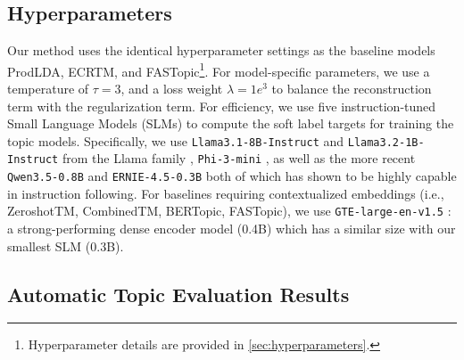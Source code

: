 \documentclass{article}
\theoremstyle{plain}
\theoremstyle{definition}
\theoremstyle{remark}
\begin{document}
\subsection{Hyperparameters} 
Our method uses the identical hyperparameter settings as the baseline models ProdLDA, ECRTM, and FASTopic\footnote{Hyperparameter details are provided in \autoref{sec:hyperparameters}.}.
For model-specific parameters, we use a temperature of $\tau = 3$, and a loss weight $\lambda = 1e^3$ to balance the reconstruction term with the regularization term. 
For efficiency, we use five instruction-tuned Small Language Models (SLMs) to compute the soft label targets for training the topic models.
Specifically, we use \texttt{Llama3.1-8B-Instruct} and \texttt{Llama3.2-1B-Instruct} from the Llama family \citep{grattafiori2024llama}, \texttt{Phi-3-mini} \citep{abdin2024phi}, as well as the more recent \texttt{Qwen3.5-0.8B} \citep{qwen2026qwen35} and \texttt{ERNIE-4.5-0.3B} \citep{ernie2025technicalreport} both of which has shown to be highly capable in instruction following. For baselines requiring contextualized embeddings (i.e., ZeroshotTM, CombinedTM, BERTopic, FASTopic), we use \texttt{GTE-large-en-v1.5} \citep{zhang-etal-2024-mgte}: a strong-performing dense encoder model (0.4B) which has a similar size with our smallest SLM (0.3B).

\subsection{Automatic Topic Evaluation Results}
\end{document}
